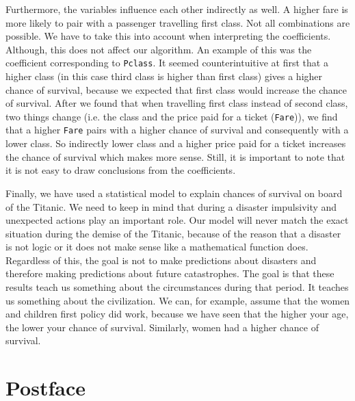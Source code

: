 \documentclass[11pt]{article}
\begin{document}
Furthermore, the variables influence each other indirectly as well. A higher fare is more likely to pair with a passenger travelling first class. Not all combinations are possible. We have to take this into account when interpreting the coefficients. Although, this does not affect our algorithm. An example of this was the coefficient corresponding to \texttt{Pclass}. It seemed counterintuitive at first that a higher class (in this case third class is higher than first class) gives a higher chance of survival, because we expected that first class would increase the chance of survival. After we found that when travelling first class instead of second class, two things change (i.e. the class and the price paid for a ticket (\texttt{Fare})), we find that a higher \texttt{Fare} pairs with a higher chance of survival and consequently with a lower class. So indirectly lower class and a higher price paid for a ticket increases the chance of survival which makes more sense. Still, it is important to note that it is not easy to draw conclusions from the coefficients. 

Finally, we have used a statistical model to explain chances of survival on board of the Titanic. We need to keep in mind that during a disaster impulsivity and unexpected actions play an important role. Our model will never match the exact situation during the demise of the Titanic, because of the reason that a disaster is not logic or it does not make sense like a mathematical function does. Regardless of this, the goal is not to make predictions about disasters and therefore making predictions about future catastrophes. The goal is that these results teach us something about the circumstances during that period. It teaches us something about the civilization. We can, for example, assume that the women and children first policy did work, because we have seen that the higher your age, the lower your chance of survival. Similarly, women had a higher chance of survival. 


\newpage
\section{Postface}
\label{sec:orgb664cc5}
\end{document}
